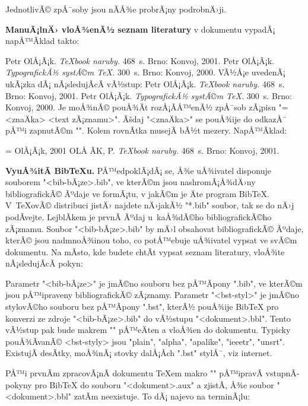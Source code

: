 JednotlivÃ© zpÅ¯soby jsou nÃ­Å¾e probrÃ¡ny podrobnÄ›ji.

\medskip\noindent
{\bf ManuÃ¡lnÄ› vloÅ¾enÃ½ seznam literatury} v dokumentu vypadÃ¡ napÅ™Ã­klad takto:
\par\nobreak

\begtt
\bib [tbn] Petr OlÅ¡Ã¡k. {\it\TeX{}book naruby.} 468~s. Brno: Konvoj, 2001.
\bib [tst] Petr OlÅ¡Ã¡k. {\it TypografickÃ½ systÃ©m \TeX.} 
                       300~s. Brno: Konvoj, 2000.
\endtt
%
VÃ½Å¡e uvedenÃ¡ ukÃ¡zka dÃ¡ nÃ¡sledujÃ­cÃ­ vÃ½stup:
\medskip
\bib[tbn] Petr OlÅ¡Ã¡k. {\it\TeX{}book naruby.} 468~s. Brno: Konvoj, 2001.
\bib[tst] Petr OlÅ¡Ã¡k. {\it TypografickÃ½ systÃ©m \TeX.} 
                    300~s. Brno: Konvoj, 2000.
\medskip
Je moÅ¾nÃ© pouÅ¾Ã­t rozÅ¡Ã­Å™enÃ½ zpÅ¯sob zÃ¡pisu 
"\bib [<lejblÃ­k>] = {<znaÄka>} <text zÃ¡znamu>". Ãšdaj "<znaÄka>" se 
pouÅ¾ije do odkazÅ¯ pÅ™i zapnutÃ©m "\nonumcitations". Kolem rovnÃ­tka musejÃ­ bÃ½t mezery.
NapÅ™Ã­klad:

\begtt
\bib [tbn] = {OlÅ¡Ã¡k, 2001} 
     OLÅ ÃK, P. {\it\TeX{}book naruby.} 468~s. Brno: Konvoj, 2001.
\endtt

\medskip\noindent
{\bf VyuÅ¾itÃ­ Bib\TeX{}u.} PÅ™edpoklÃ¡dÃ¡ se, Å¾e uÅ¾ivatel disponuje souborem
"<bib-bÃ¡ze>.bib", ve kterÃ©m jsou nashromÃ¡Å¾dÄ›ny bibliografickÃ© Ãºdaje ve
formÃ¡tu, v jakÃ©m je Äte program Bib\TeX{}. V~\TeX{}ovÃ© distribuci jistÄ›
najdete nÄ›jakÃ½ "*.bib" soubor, tak se do nÄ›j podÃ­vejte. LejblÃ­kem je prvnÃ­
Ãºdaj u~kaÅ¾dÃ©ho bibliografickÃ©ho zÃ¡znamu. Soubor "<bib-bÃ¡ze>.bib" by mÄ›l
obsahovat bibliografickÃ© Ãºdaje, kterÃ© jsou nadmnoÅ¾inou toho, co potÅ™ebuje
uÅ¾ivatel vypsat ve svÃ©m dokumentu.
Na mÃ­sto, kde budete chtÃ­t vypsat seznam
literatury, vloÅ¾te nÃ¡sledujÃ­cÃ­ pokyn:

\begtt
{}
\endtt

Parametr "<bib-bÃ¡ze>" je jmÃ©no souboru bez pÅ™Ã­pony ".bib", ve kterÃ©m jsou
pÅ™ipraveny bibliografickÃ© zÃ¡znamy. Parametr "<bst-styl>" je jmÃ©no
stylovÃ©ho souboru bez pÅ™Ã­pony ".bst", kterÃ½ pouÅ¾ije Bib\TeX{} pro konverzi ze zdroje
"<bib-bÃ¡ze>.bib" do vÃ½stupu "<dokument>.bbl". Tento vÃ½stup pak bude makrem
"\usebibtex" pÅ™eÄten a vloÅ¾en do dokumentu. Typicky pouÅ¾Ã­vanÃ© <bst-styly>
jsou "plain", "alpha", "apalike", "ieeetr", "unsrt". 
ExistujÃ­ desÃ­tky, moÅ¾nÃ¡ stovky dalÅ¡Ã­ch ".bst" stylÅ¯, viz internet.

PÅ™i prvnÃ­m zpracovÃ¡nÃ­ dokumentu \TeX{}em makro "\usebibtex" pÅ™ipravÃ­ vstupnÃ­
pokyny pro Bib\TeX{} do souboru "<dokument>.aux" a zjistÃ­, Å¾e soubor
"<dokument>.bbl" zatÃ­m neexistuje. To dÃ¡ najevo na terminÃ¡lu:

